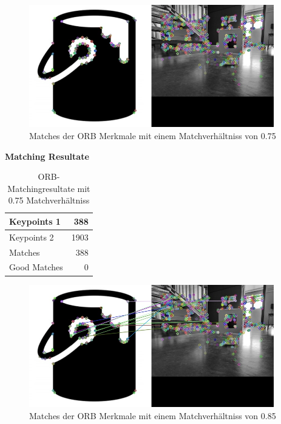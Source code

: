 \begin{figure}[H]
  \includegraphics[width=0.95\textwidth]{img/piktogrammerkennung/orb_matches.jpg}
  \centering
  \caption{Matches der ORB Merkmale mit einem Matchverhältniss von 0.75}
  \label{fig:orb-matches-0.75}
\end{figure}

\textbf{Matching Resultate}
\begin{center}
\begin{table}[H]
\begin{tabular}{|l|r|}
\hline
Keypoints 1 & 388 \\
\hline
Keypoints 2 & 1903 \\
\hline
Matches & 388 \\
\hline
Good Matches & 0 \\
\hline
\end{tabular}
\caption[ORB-Matchingresultate mit 0.75 Matchverhältniss]{ORB-Matchingresultate  mit 0.75 Matchverhältniss}
\label{tab:orb-matchingresultate-0.75}
\end{table}
\end{center}

\begin{figure}[H]
  \includegraphics[width=0.95\textwidth]{img/piktogrammerkennung/orb_matches_0.85.jpg}
  \centering
  \caption{Matches der ORB Merkmale mit einem Matchverhältniss von 0.85}
  \label{fig:orb-matches-0.85}
\end{figure}

